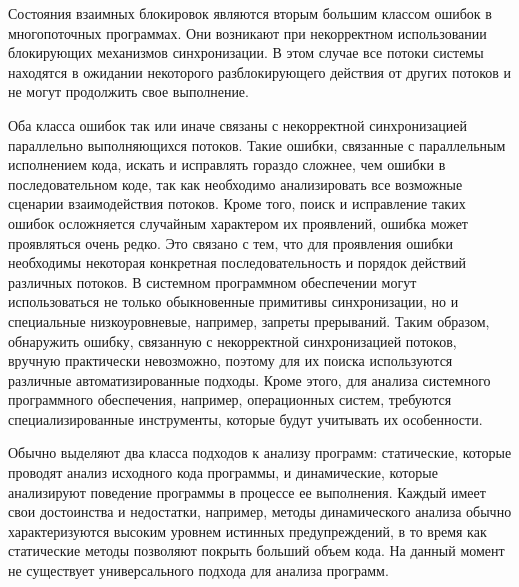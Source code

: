  
Состояния взаимных блокировок являются вторым большим классом ошибок в многопоточных программах.
Они возникают при некорректном использовании блокирующих механизмов синхронизации.
В этом случае все потоки системы находятся в ожидании некоторого разблокирующего действия от других потоков и не могут продолжить свое выполнение. 

Оба класса ошибок так или иначе связаны с некорректной синхронизацией параллельно выполняющихся потоков.
Такие ошибки, связанные с параллельным исполнением кода, искать и исправлять гораздо сложнее, чем ошибки в последовательном коде, так как необходимо анализировать все возможные сценарии взаимодействия потоков.
Кроме того, поиск и исправление таких ошибок осложняется случайным характером их проявлений, ошибка может проявляться очень редко.
Это связано с тем, что для проявления ошибки необходимы некоторая конкретная последовательность и порядок действий различных потоков. 
В системном программном обеспечении могут использоваться не только обыкновенные примитивы синхронизации, но и специальные низкоуровневые, например, запреты прерываний. 
Таким образом, обнаружить ошибку, связанную с некорректной синхронизацией потоков, вручную практически невозможно, поэтому для их поиска используются различные автоматизированные подходы.
Кроме этого, для анализа системного программного обеспечения, например, операционных систем, требуются специализированные инструменты, которые будут учитывать их особенности.

Обычно выделяют два класса подходов к анализу программ: статические, которые проводят анализ исходного кода программы, и динамические, которые анализируют поведение программы в процессе ее выполнения.
Каждый имеет свои достоинства и недостатки, например, методы динамического анализа обычно характеризуются высоким уровнем истинных предупреждений, в то время как статические методы позволяют покрыть больший объем кода.
На данный момент не существует универсального подхода для анализа программ.

